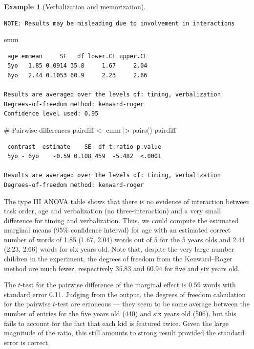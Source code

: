 \documentclass[
  11pt,
  letterpaper,
]{scrbook}
\newenvironment{Shaded}{\begin{snugshade}}{\end{snugshade}}
\newcommand{\CommentTok}[1]{\textcolor[rgb]{0.37,0.37,0.37}{#1}}
\newcommand{\FunctionTok}[1]{\textcolor[rgb]{0.28,0.35,0.67}{#1}}
\newcommand{\NormalTok}[1]{\textcolor[rgb]{0.00,0.23,0.31}{#1}}
\newcommand{\OtherTok}[1]{\textcolor[rgb]{0.00,0.23,0.31}{#1}}
\newcommand{\SpecialCharTok}[1]{\textcolor[rgb]{0.37,0.37,0.37}{#1}}
\theoremstyle{definition}
\newtheorem{example}{Example}[chapter]
\theoremstyle{remark}
\begin{document}
\begin{example}[Verbalization and
memorization]
\begin{verbatim}
NOTE: Results may be misleading due to involvement in interactions
\end{verbatim}

\begin{Shaded}
\begin{Highlighting}[]
\NormalTok{emm}
\end{Highlighting}
\end{Shaded}

\begin{verbatim}
 age emmean     SE   df lower.CL upper.CL
 5yo   1.85 0.0914 35.8     1.67     2.04
 6yo   2.44 0.1053 60.9     2.23     2.66

Results are averaged over the levels of: timing, verbalization 
Degrees-of-freedom method: kenward-roger 
Confidence level used: 0.95 
\end{verbatim}

\begin{Shaded}
\begin{Highlighting}[]
\CommentTok{\# Pairwise differences}
\NormalTok{pairdiff }\OtherTok{\textless{}{-}}\NormalTok{ emm }\SpecialCharTok{|\textgreater{}} \FunctionTok{pairs}\NormalTok{()}
\NormalTok{pairdiff}
\end{Highlighting}
\end{Shaded}

\begin{verbatim}
 contrast  estimate    SE  df t.ratio p.value
 5yo - 6yo    -0.59 0.108 459  -5.482  <.0001

Results are averaged over the levels of: timing, verbalization 
Degrees-of-freedom method: kenward-roger 
\end{verbatim}

The type III ANOVA table shows that there is no evidence of interaction
between task order, age and verbalization (no three-interaction) and a
very small difference for timing and verbalization. Thus, we could
compute the estimated marginal means (95\% confidence interval) for age
with an estimated correct number of words of 1.85 (1.67, 2.04) words out
of 5 for the 5 years olds and 2.44 (2.23, 2.66) words for six years old.
Note that, despite the very large number children in the experiment, the
degrees of freedom from the Kenward--Roger method are much fewer,
respectively 35.83 and 60.94 for five and six years old.

The \(t\)-test for the pairwise difference of the marginal effect is
0.59 words with standard error 0.11. Judging from the output, the
degrees of freedom calculation for the pairwise \(t\)-test are erroneous
--- they seem to be some average between the number of entries for the
five years old (440) and six years old (506), but this fails to account
for the fact that each kid is featured twice. Given the large magnitude
of the ratio, this still amounts to strong result provided the standard
error is correct.


\end{example}
\end{document}
